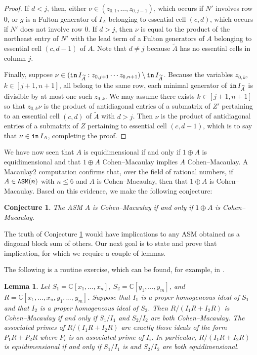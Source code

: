 \documentclass[12 pt]{amsart}
\DeclareMathOperator{\init}{{\tt in}}
\DeclareMathOperator{\asm}{\tt ASM}
\theoremstyle{plain}
\newtheorem{lemma}[thm]{Lemma}
\newtheorem{conjecture}[thm]{Conjecture}
\theoremstyle{definition}
\theoremstyle{remark}
\begin{document}
{\begin{proof}
    
    If $d<j$, then, either $\nu \in (z_{0,1}, \ldots, z_{0,j-1})$, which occurs if $N'$ involves row $0$, or $g$ is a Fulton generator of $I_A$ belonging to essential cell $(c,d)$, which occurs if $N'$ does not involve row $0$.  If $d > j$, then $\nu$ is equal to the product of the northeast entry of $N'$ with the lead term of a Fulton generators of $A$ belonging to essential cell $(c,d-1)$ of $A$.  Note that $d \neq j$ because $\widetilde{A}$ has no essential cells in column $j$.
    
    Finally, suppose $\nu \in (\init I_{\widetilde{A}}:z_{0,j+1}\cdots z_{0,n+1})\setminus \init I_{\widetilde{A}}$.  Because the variables $z_{0,k}$, $k \in [j+1,n+1]$, all belong to the same row, each minimal generator of $\init I_{\widetilde{A}}$ is divisible by at most one such $z_{0,k}$.  We may assume there exists $k\in [j+1,n+1]$ so that $z_{0,k}\nu$ is the product of antidiagonal entries of a submatrix of $Z'$ pertaining to an essential cell $(c,d)$ of $\widetilde{A}$ with $d>j$.  Then $\nu$ is the product of antidiagonal entries of a submatrix of $Z$ pertaining to essential cell $(c,d-1)$, which is to say that $\nu \in \init I_A$, completing the proof.
\end{proof}

We have now seen that $A$ is equidimensional if and only if $1 \oplus A$ is equidimensional and that $1 \oplus A$ Cohen--Macaulay implies $A$ Cohen--Macaulay.  A Macaulay2 computation confirms that, over the field of rational numbers, if $A \in \asm(n)$ with $n \leq 6$ and $A$ is Cohen--Macaulay, then  that $1 \oplus A$ is Cohen--Macaulay.  Based on this evidence, we make the following conjecture:

\begin{conjecture}\label{conj:CM}
    The ASM $A$ is Cohen--Macaulay if and only if $1 \oplus A$ is Cohen--Macaulay.
\end{conjecture}

The truth of Conjecture \ref{conj:CM} would have implications to any ASM obtained as a diagonal block sum of others.  Our next goal is to state and prove that implication, for which we require a couple of lemmas.

The following is a routine exercise, which can be found, for example, in \cite[Chapter 3]{Vil15}.

\begin{lemma}\label{lem:CMness-variables}
Let $S_1 = \mathbb{C}[x_1, \ldots, x_n]$, $S_2 = \mathbb{C}[y_1, \ldots, y_m]$, and $R = \mathbb{C}[x_1, \ldots, x_n,y_1,\ldots,y_m]$.  Suppose that $I_1$ is a proper homogeneous ideal of $S_1$ and that $I_2$ is a proper homogeneous ideal of $S_2$. Then $R/(I_1R+I_2R)$ is Cohen--Macaulay if and only if $S_1/I_1$ and $S_2/I_2$ are both Cohen--Macaulay.  The associated primes of $R/(I_1R+I_2R)$ are exactly those ideals of the form $P_1R+P_2R$ where $P_i$ is an associated prime of $I_i$.  In particular, $R/(I_1R+I_2R)$ is equidimensional if and only if $S_1/I_1$ is and $S_2/I_2$ are both equidimensional.
\end{lemma}

}
\end{document}
